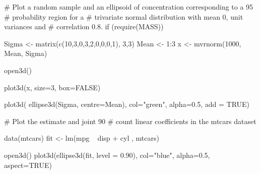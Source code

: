 \documentclass{article}
\begin{document}
\begin{Examples}
\begin{ExampleCode}
# Plot a random sample and an ellipsoid of concentration corresponding to a 95%
# probability region for a
# trivariate normal distribution with mean 0, unit variances and 
# correlation 0.8.
if (require(MASS)) {
  Sigma <- matrix(c(10,3,0,3,2,0,0,0,1), 3,3)
  Mean <- 1:3
  x <- mvrnorm(1000, Mean, Sigma)
  
  open3d()
  
  plot3d(x, size=3, box=FALSE)
  
  plot3d( ellipse3d(Sigma, centre=Mean), col="green", alpha=0.5, add = TRUE)
}  

# Plot the estimate and joint 90%
# count linear coefficients in the mtcars dataset

data(mtcars)
fit <- lm(mpg ~ disp + cyl , mtcars)

open3d()
plot3d(ellipse3d(fit, level = 0.90), col="blue", alpha=0.5, aspect=TRUE)
\end{ExampleCode}
\end{Examples}
\end{document}
